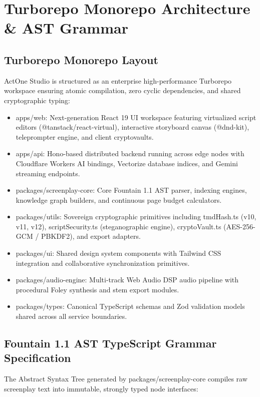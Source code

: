 \documentclass[11pt,a4paper,reqno]{article}
\def\texttt#1{#1}%
\theoremstyle{plain}
\theoremstyle{definition}
\theoremstyle{remark}
\numberwithin{equation}{section}
\begin{document}
\section{\texorpdfstring{Turborepo Monorepo Architecture \& AST Grammar}{Turborepo Monorepo Architecture and AST Grammar}}
\label{sec:turborepo}

\subsection{\texorpdfstring{Turborepo Monorepo Layout}{Turborepo Monorepo Layout}}
ActOne Studio is structured as an enterprise high-performance Turborepo workspace ensuring atomic compilation, zero cyclic dependencies, and shared cryptographic typing:
\begin{itemize}[leftmargin=2.0em, itemsep=0.3em]
    \item \texttt{apps/web}: Next-generation React 19 UI workspace featuring virtualized script editors (\texttt{@tanstack/react-virtual}), interactive storyboard canvas (\texttt{@dnd-kit}), teleprompter engine, and client cryptovaults.
    \item \texttt{apps/api}: Hono-based distributed backend running across edge nodes with Cloudflare Workers AI bindings, Vectorize database indices, and Gemini streaming endpoints.
    \item \texttt{packages/screenplay-core}: Core Fountain 1.1 AST parser, indexing engines, knowledge graph builders, and continuous page budget calculators.
    \item \texttt{packages/utils}: Sovereign cryptographic primitives including \texttt{tmdHash.ts} (v10, v11, v12), \texttt{scriptSecurity.ts} (steganographic engine), \texttt{cryptoVault.ts} (AES-256-GCM / PBKDF2), and export adapters.
    \item \texttt{packages/ui}: Shared design system components with Tailwind CSS integration and collaborative synchronization primitives.
    \item \texttt{packages/audio-engine}: Multi-track Web Audio DSP audio pipeline with procedural Foley synthesis and stem export modules.
    \item \texttt{packages/types}: Canonical TypeScript schemas and Zod validation models shared across all service boundaries.
\end{itemize}

\subsection{\texorpdfstring{Fountain 1.1 AST TypeScript Grammar Specification}{Fountain 1.1 AST TypeScript Grammar Specification}}
The Abstract Syntax Tree generated by \texttt{packages/screenplay-core} compiles raw screenplay text into immutable, strongly typed node interfaces:
\end{document}
